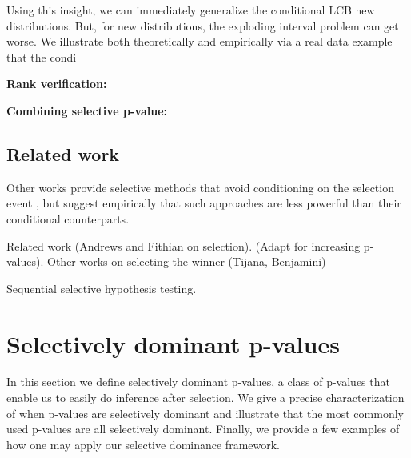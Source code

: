 \documentclass{article}
\begin{document}
Using this insight, we can immediately generalize the conditional LCB new distributions. But, for new distributions, the exploding interval problem can get worse. We illustrate both theoretically and empirically via a real data example that the condi

\noindent \textbf{Rank verification: }\newline 

\noindent \textbf{Combining selective p-value: } \newline 

\subsection{Related work}

 


Other works provide selective methods that avoid conditioning on the selection event \cite{Zrnic, }, but \cite{W} suggest empirically that such approaches are less powerful than their conditional counterparts. 



Related work (Andrews and Fithian on selection). (Adapt for increasing p-values). Other works on selecting the winner (Tijana, Benjamini) 

Sequential selective hypothesis testing. 


\section{Selectively dominant p-values}
\label{sec:dominance}

In this section we define selectively dominant p-values, a class of p-values that enable us to easily do inference after selection. We give a precise characterization of when p-values are selectively dominant and illustrate that the most commonly used p-values are all selectively dominant. Finally, we provide a few examples of how one may apply our selective dominance framework. 
\end{document}
